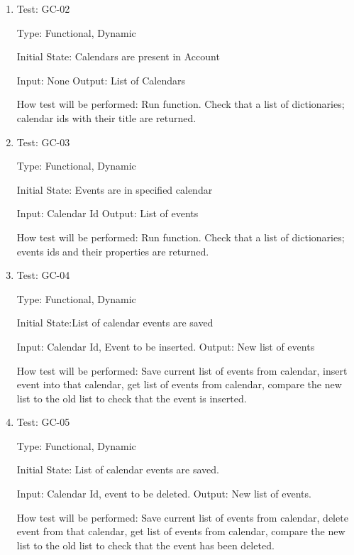 \documentclass[12pt, titlepage]{article}
\begin{document}
\begin{enumerate}

\item{Test: GC-02\\}

Type: Functional, Dynamic
					
Initial State: Calendars are present in Account
					
Input: None
Output: List of Calendars
					
How test will be performed: Run function. Check that a list of dictionaries; calendar ids with their title are returned.

\item{Test: GC-03\\}

Type: Functional, Dynamic
					
Initial State: Events are in specified calendar
					
Input: Calendar Id
Output: List of events
					
How test will be performed: Run function. Check that a list of dictionaries; events ids and their properties are returned.

\item{Test: GC-04\\}

Type: Functional, Dynamic
					
Initial State:List of calendar events are saved
					
Input: Calendar Id, Event to be inserted.
Output: New list of events
					
How test will be performed: Save current list of events from calendar, insert event into that calendar, get list of events from calendar, compare the new list to the old list to check that the event is inserted. 

\item{Test: GC-05\\}

Type: Functional, Dynamic
					
Initial State: List of calendar events are saved.

					
Input: Calendar Id, event to be deleted. 
Output: New list of events.
					
How test will be performed: Save current list of events from calendar, delete event from that calendar, get list of events from calendar, compare the new list to the old list to check that the event has been deleted.

\end{enumerate}
\end{document}

